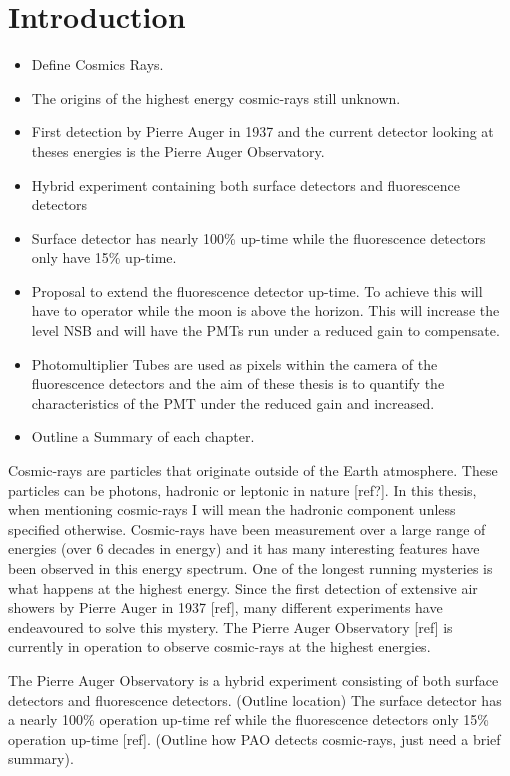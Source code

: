 \chapter*{Introduction}\label{Ch:Intro}

\begin{itemize}
\item Define Cosmics Rays.
\item The origins of the highest energy cosmic-rays still unknown.
\item First detection by Pierre Auger in 1937 and the current detector looking at theses energies is the Pierre Auger Observatory.
\item Hybrid experiment containing both surface detectors and fluorescence detectors
\item Surface detector has nearly 100\% up-time while the fluorescence detectors only have 15\% up-time.
\item Proposal to extend the fluorescence detector up-time. To achieve this will have to operator while the moon is above the horizon. This will increase the level NSB and will have the PMTs run under a reduced gain to compensate.
\item Photomultiplier Tubes are used as pixels within the camera of the fluorescence detectors and  the aim of these thesis is to quantify the characteristics of the PMT under the reduced gain and increased.
\item Outline a Summary of each chapter.
\end{itemize}


Cosmic-rays are particles that originate outside of the Earth atmosphere. These particles can be photons, hadronic or leptonic in nature [ref?]. In this thesis, when mentioning cosmic-rays I will mean the hadronic component unless specified otherwise. Cosmic-rays have been measurement over a large range of energies (over 6 decades in energy) and it has many interesting features have been observed in this energy spectrum. One of the longest running mysteries is what happens at the highest energy. Since the first detection of extensive air showers by Pierre Auger in 1937 [ref], many different experiments have endeavoured to solve this mystery. The Pierre Auger Observatory [ref] is currently in operation to observe cosmic-rays at the highest energies. 

The Pierre Auger Observatory is a hybrid experiment consisting of both surface detectors and fluorescence detectors. (Outline location) The surface detector has a nearly 100\% operation up-time {ref} while the fluorescence detectors only 15\% operation up-time [ref]. (Outline how PAO detects cosmic-rays, just need a brief summary).

